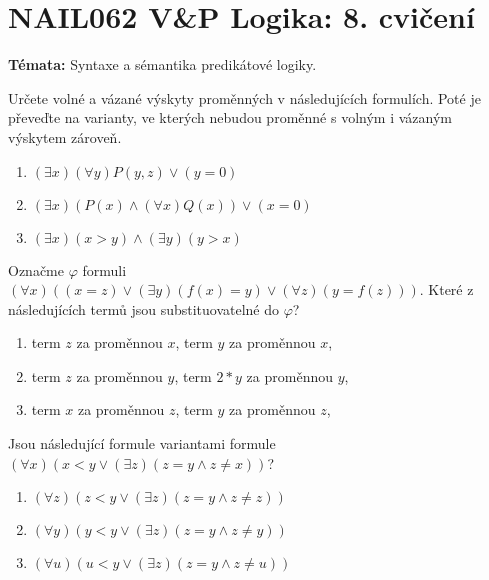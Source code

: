 \documentclass[a4paper,12pt]{article}
\begin{document}
\section*{NAIL062 V\&P Logika: 8. cvičení}

\textbf{Témata:}
Syntaxe a sémantika predikátové logiky.


\medskip\begin{problem}
    Určete volné a vázané výskyty proměnných v následujících formulích. Poté je převeďte na varianty, ve kterých nebudou proměnné s volným i vázaným výskytem zároveň.
    \begin{enumerate}
       \item $(\exists x)(\forall y)P(y,z) \vee (y=0)$
       \item $(\exists x)(P(x) \wedge (\forall x)Q(x)) \vee (x=0)$
       \item $(\exists x)(x>y) \wedge (\exists y)(y>x)$
    \end{enumerate}
    \end{problem}
    
    \medskip\begin{problem}
    Označme $\varphi$ formuli $(\forall x)((x=z) \vee (\exists y)(f(x)=y) \vee (\forall z)(y=f(z)))$. Které z následujících termů jsou substituovatelné do $\varphi$?
    \begin{enumerate}
       \item term $z$ za proměnnou $x$, term $y$ za proměnnou $x$,
       \item term $z$ za proměnnou $y$, term $2*y$ za proměnnou $y$,
       \item term $x$ za proměnnou $z$, term $y$ za proměnnou $z$,
    \end{enumerate}
\end{problem}
    
\medskip\begin{problem}
    Jsou následující formule variantami formule $(\forall x)(x<y \vee (\exists z)(z=y \wedge z\ne x))$?
    \begin{enumerate}
    \item $(\forall z)(z<y \vee (\exists z)(z=y \wedge z\ne z))$
    \item $(\forall y)(y<y \vee (\exists z)(z=y \wedge z\ne y))$
    \item $(\forall u)(u<y \vee (\exists z)(z=y \wedge z\ne u))$
    \end{enumerate}
\end{problem}
    
\end{document}
